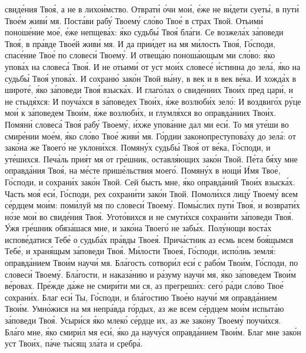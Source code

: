 \begin{mymulticols}
свид\'{е}ния Тво\'{я}, а не в лихо\'{и}мство. Отврат\'{и} \'{о}чи мо\'{и}, \'{е}же не в\'{и}дети сует\'{ы}, в пут\'{и} Тво\'{е}м жив\'{и} мя. Пост\'{а}ви раб\'{у} Твоем\'{у} сл\'{о}во Тво\'{е} в страх Твой. Отьим\'{и} понош\'{е}ние мо\'{е}, \'{е}же непщев\'{а}х: \'{я}ко судьб\'{ы} Тво\'{я} бл\'{а}ги. Се возжел\'{а}х з\'{а}поведи Тво\'{я}, в пр\'{а}вде Тво\'{е}й жив\'{и} мя. И да при\'{и}дет на мя м\'{и}лость Тво\'{я}, Г\'{о}споди, спас\'{е}ние Тво\'{е} по словес\'{и} Твоем\'{у}. И отвещ\'{а}ю понош\'{а}ющым ми сл\'{о}во: \'{я}ко упов\'{а}х на словес\'{а} Тво\'{я}. И не отьим\'{и} от уст мо\'{и}х словес\'{е} \'{и}стинна до зел\'{а}, \'{я}ко на судьб\'{ы} Тво\'{я} упов\'{а}х. И сохран\'{ю} зак\'{о}н Твой в\'{ы}ну, в век и в век в\'{е}ка. И хожд\'{а}х в широт\'{е}, \'{я}ко з\'{а}поведи Тво\'{я} взыск\'{а}х. И глаг\'{о}лах о свид\'{е}ниих Тво\'{и}х пред цар\'{и}, и не стыд\'{я}хся: И поуч\'{а}хся в з\'{а}поведех Тво\'{и}х, \'{я}же возлюб\'{и}х зел\'{о}: И воздвиг\'{о}х р\'{у}це мо\'{и} к з\'{а}поведем Тво\'{и}м, \'{я}же возлюб\'{и}х, и глумл\'{я}хся во оправд\'{а}ниих Тво\'{и}х. Помян\'{и} словес\'{а} Тво\'{я} раб\'{у} Твоем\'{у}, \'{и}хже упов\'{а}ние дал ми ес\'{и}. То мя ут\'{е}ши во смир\'{е}нии мо\'{е}м, \'{я}ко сл\'{о}во Тво\'{е} жив\'{и} мя. Г\'{о}рдии законопреступов\'{а}ху до зел\'{а}: от зак\'{о}на же Твоег\'{о} не уклон\'{и}хся. Помян\'{у}х судьб\'{ы} Тво\'{я} от в\'{е}ка, Г\'{о}споди, и ут\'{е}шихся. Печ\'{а}ль при\'{я}т мя от гр\'{е}шник, оставл\'{я}ющих зак\'{о}н Твой. П\'{е}та б\'{я}ху мне оправд\'{а}ния Тво\'{я}, на м\'{е}сте приш\'{е}льствия моег\'{о}. Помян\'{у}х в нощ\'{и} \'{И}мя Тво\'{е}, Г\'{о}споди, и сохран\'{и}х зак\'{о}н Твой. Сей бысть мне, \'{я}ко оправд\'{а}ний Тво\'{и}х взыск\'{а}х. Часть мо\'{я} ес\'{и}, Г\'{о}споди, рех сохран\'{и}ти зак\'{о}н Твой. Помол\'{и}хся лиц\'{у} Твоем\'{у} всем с\'{е}рдцем мо\'{и}м: пом\'{и}луй мя по словес\'{и} Твоем\'{у}. Пом\'{ы}слих пут\'{и} Тво\'{я}, и возврат\'{и}х н\'{о}зе мо\'{и} во свид\'{е}ния Тво\'{я}. Угот\'{о}вихся и не смут\'{и}хся сохран\'{и}ти з\'{а}поведи Тво\'{я}. \'{У}жя гр\'{е}шник обяз\'{а}шася мне, и зак\'{о}на Твоег\'{о} не заб\'{ы}х. Пол\'{у}нощи вост\'{а}х испов\'{е}датися Теб\'{е} о судьб\'{а}х пр\'{а}вды Твое\'{я}. Прич\'{а}стник аз есмь всем бо\'{я}щымся Теб\'{е}, и хран\'{я}щым з\'{а}поведи Тво\'{я}. М\'{и}лости Твое\'{я}, Г\'{о}споди, исп\'{о}лнь земл\'{я}: оправд\'{а}нием Тво\'{и}м науч\'{и} мя. Бл\'{а}гость сотвор\'{и}л ес\'{и} с раб\'{о}м Тво\'{и}м, Г\'{о}споди, по словес\'{и} Твоем\'{у}. Бл\'{а}гости, и наказ\'{а}нию и р\'{а}зуму науч\'{и} мя, \'{я}ко з\'{а}поведем Тво\'{и}м в\'{е}ровах. Пр\'{е}жде д\'{а}же не смир\'{и}ти ми ся, аз прегреш\'{и}х: сег\'{о} р\'{а}ди сл\'{о}во Тво\'{е} сохран\'{и}х. Благ ес\'{и} Ты, Г\'{о}споди, и бл\'{а}гостию Тво\'{е}ю науч\'{и} мя оправд\'{а}нием Тво\'{и}м. Умн\'{о}жися на мя непр\'{а}вда г\'{о}рдых, аз же всем с\'{е}рдцем мо\'{и}м испыт\'{а}ю з\'{а}поведи Тво\'{я}. Усыр\'{и}ся \'{я}ко млек\'{о} с\'{е}рдце их, аз же зак\'{о}ну Твоем\'{у} поуч\'{и}хся. Бл\'{а}го мне, \'{я}ко смир\'{и}л мя ес\'{и}, \'{я}ко да науч\'{у}ся оправд\'{а}нием Тво\'{и}м. Благ мне зак\'{о}н уст Тво\'{и}х, п\'{а}че т\'{ы}сящ зл\'{а}та и сребр\'{а}.


\end{mymulticols}
